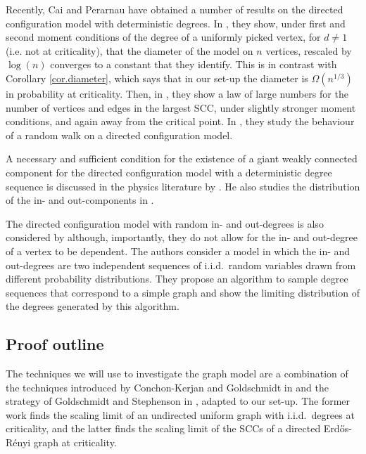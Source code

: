 Recently, Cai and Perarnau have obtained a number of results on the directed configuration model with deterministic degrees. In \cite{caiDiameterDirectedConfiguration2020}, they show, under first and second moment conditions of the degree of a uniformly picked vertex, for $d\neq 1$ (i.e. not at criticality), that the diameter of the model on $n$ vertices, rescaled by $\log(n)$ converges to a constant that they identify. This is in contrast with Corollary \ref{cor.diameter}, which says that in our set-up the diameter is $\Omega(n^{1/3})$ in probability at criticality. Then, in \cite{caiGiantComponentDirected2020}, they show a law of large numbers for the number of vertices and edges in the largest SCC, under slightly stronger moment conditions, and again away from the critical point. In \cite{cai2021rw}, they study the behaviour of a random walk on a directed configuration model.
 
A necessary and sufficient condition for the existence of a giant weakly connected component for the directed configuration model with a deterministic degree sequence is discussed in the physics literature by \citet{Kryven2016}. He also studies the distribution of the in- and out-components in \cite{Kryven2017}.

The directed configuration model with random in- and out-degrees is also considered by \citet{chenDirectedRandomGraphs2013} although, importantly, they do not allow for the in- and out-degree of a vertex to be dependent. The authors consider a model in which the in- and out-degrees are two independent sequences of i.i.d.\ random variables drawn from different probability distributions. They propose an algorithm to sample degree sequences that correspond to a simple graph and show the limiting distribution of the degrees generated by this algorithm. 



\subsection{Proof outline}\label{sec:proofoutline}

\def \exploredvertices {\mathcal V}
\def \explorededges {\mathcal E}
\def \forest {F}
\def \edgestack {\mathcal Q}

The techniques we will use to investigate the graph model are a combination of the techniques introduced by Conchon-Kerjan and Goldschmidt in \cite{conchon--kerjanStableGraphMetric2020} and the strategy of Goldschmidt and Stephenson in \cite{goldschmidtScalingLimitCritical2019}, adapted to our set-up. The former work finds the scaling limit of an undirected uniform graph with i.i.d.\ degrees at criticality, and the latter finds the scaling limit of the SCCs of a directed Erd\H{o}s-Rényi graph at criticality. 

